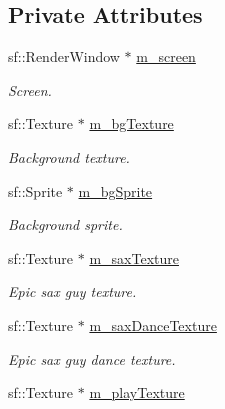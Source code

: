 \subsection*{Private Attributes}
\begin{DoxyCompactItemize}
\item 
\hypertarget{class_menu_a372778deb3a50ce92743ab3401c96324}{sf\-::\-Render\-Window $\ast$ \hyperlink{class_menu_a372778deb3a50ce92743ab3401c96324}{m\-\_\-screen}}\label{class_menu_a372778deb3a50ce92743ab3401c96324}

\begin{DoxyCompactList}\small\item\em Screen. \end{DoxyCompactList}\item 
\hypertarget{class_menu_a48dda7eda5fd21a5f82944302cfe49d4}{sf\-::\-Texture $\ast$ \hyperlink{class_menu_a48dda7eda5fd21a5f82944302cfe49d4}{m\-\_\-bg\-Texture}}\label{class_menu_a48dda7eda5fd21a5f82944302cfe49d4}

\begin{DoxyCompactList}\small\item\em Background texture. \end{DoxyCompactList}\item 
\hypertarget{class_menu_aa43a1797c926bd25f68dfb586f252486}{sf\-::\-Sprite $\ast$ \hyperlink{class_menu_aa43a1797c926bd25f68dfb586f252486}{m\-\_\-bg\-Sprite}}\label{class_menu_aa43a1797c926bd25f68dfb586f252486}

\begin{DoxyCompactList}\small\item\em Background sprite. \end{DoxyCompactList}\item 
\hypertarget{class_menu_a582d3e3b47317dcbf5125c1b902ef59d}{sf\-::\-Texture $\ast$ \hyperlink{class_menu_a582d3e3b47317dcbf5125c1b902ef59d}{m\-\_\-sax\-Texture}}\label{class_menu_a582d3e3b47317dcbf5125c1b902ef59d}

\begin{DoxyCompactList}\small\item\em Epic sax guy texture. \end{DoxyCompactList}\item 
\hypertarget{class_menu_a96ec3efb7af905a0c36d7919bc9b72c5}{sf\-::\-Texture $\ast$ \hyperlink{class_menu_a96ec3efb7af905a0c36d7919bc9b72c5}{m\-\_\-sax\-Dance\-Texture}}\label{class_menu_a96ec3efb7af905a0c36d7919bc9b72c5}

\begin{DoxyCompactList}\small\item\em Epic sax guy dance texture. \end{DoxyCompactList}\item 
\hypertarget{class_menu_ac907be23bf34e8cd7f05d5ea42d120e2}{sf\-::\-Texture $\ast$ \hyperlink{class_menu_ac907be23bf34e8cd7f05d5ea42d120e2}{m\-\_\-play\-Texture}}\label{class_menu_ac907be23bf34e8cd7f05d5ea42d120e2}


\end{DoxyCompactItemize}
